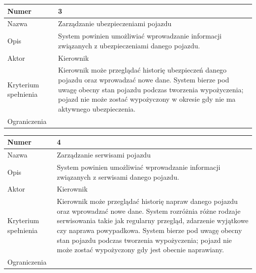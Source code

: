\documentclass[eng,printmode,openany]{mgr}
\begin{document}
\begin{table}[H]
	\begin{tabularx}{\textwidth}{|l|X|}
		\hline
		Numer                & 3 \\ \hline
		Nazwa                & Zarządzanie ubezpieczeniami pojazdu \\ \hline
		Opis                 & System powinien umożliwiać wprowadzanie informacji związanych z ubezpieczeniami danego pojazdu. \\ \hline
		Aktor                & Kierownik \\ \hline
		Kryterium spełnienia & Kierownik może przeglądać historię ubezpieczeń danego pojazdu oraz wprowadzać nowe dane. System bierze pod uwagę obecny stan pojazdu podczas tworzenia wypożyczenia;  pojazd nie może zostać wypożyczony w okresie gdy nie ma aktywnego ubezpieczenia. \\ \hline
		Ograniczenia         & \\ \hline
	\end{tabularx}
\end{table}

\begin{table}[H]
	\begin{tabularx}{\textwidth}{|l|X|}
		\hline
		Numer                & 4 \\ \hline
		Nazwa                & Zarządzanie serwisami pojazdu \\ \hline
		Opis                 & System powinien umożliwiać wprowadzanie informacji związanych z serwisami danego pojazdu. \\ \hline
		Aktor                & Kierownik \\ \hline
		Kryterium spełnienia & Kierownik może przeglądać historię napraw danego pojazdu oraz wprowadzać nowe dane. System rozróżnia różne rodzaje serwisowania takie jak regularny przegląd, zdarzenie wyjątkowe czy naprawa powypadkowa. System bierze pod uwagę obecny stan pojazdu podczas tworzenia wypożyczenia; pojazd nie może zostać wypożyczony gdy jest obecnie naprawiany. \\ \hline
		Ograniczenia         & \\ \hline
	\end{tabularx}
\end{table}
\end{document}
